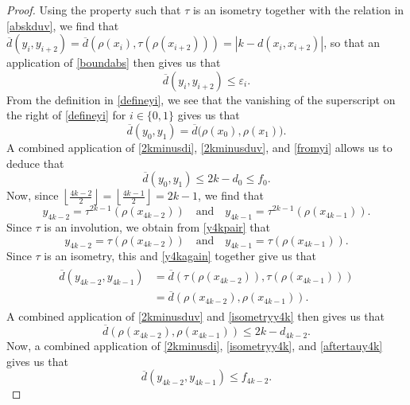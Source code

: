 \documentclass[10pt,a4paper]{amsart}
\begin{document}
\begin{proof}
 Using the property such that $\tau$ is an isometry together with the relation in \eqref{abskduv}, we find that $\overline{d}(y_i, y_{i + 
 2}) = \overline{d}(\rho(x_i), \tau(\rho(x_{i+2})))  = |k - d(x_{i}, x_{i+2}) |$, so that an application of \eqref{boundabs} 
 then gives us that 
\begin{equation}\label{metricgaptwo}
 \overline{d}(y_{i}, y_{i+2}) \leq \varepsilon_{i}. 
\end{equation}
 From the definition in \eqref{defineyi}, we see that the vanishing of the superscript on the right of \eqref{defineyi} for $i \in \{ 0, 
 1 \}$ gives us that 
\begin{equation}\label{fromyi} 
 \overline{d}(y_0, y_1) = \overline{d}\big( \rho(x_0), \rho(x_1) \big). 
\end{equation}
 A combined application of \eqref{2kminusdi}, \eqref{2kminusduv}, and 
 \eqref{fromyi} allows us to deduce that 
\begin{equation}\label{firstendpoint}
 \overline{d}(y_0, y_1) \leq 2 k - d_0 \leq f_0. 
\end{equation}
Now, since
 $\left\lfloor \frac{4k-2}{2} \right\rfloor = \left\lfloor \frac{4k-1}{2} \right\rfloor = 2 k - 1$, 
 we find that 
\begin{equation}\label{y4kpair}
 y_{4k-2} = \tau^{2k-1}\left( \rho(x_{4k-2}) \right) \quad \text{and} \quad
 y_{4k-1} = \tau^{2k-1}\left( \rho(x_{4k-1}) \right). 
\end{equation}
 Since $\tau$ is an involution, we obtain from \eqref{y4kpair} that 
\begin{equation}\label{y4kagain}
 y_{4k-2} = \tau\left( \rho(x_{4k-2}) \right) \quad \text{and} \quad
 y_{4k-1} = \tau\left( \rho(x_{4k-1}) \right). 
\end{equation}
 Since $\tau$ is an isometry, this and \eqref{y4kagain} together give us that 
\begin{align}
\begin{split}
 \overline{d}(y_{4k-2}, y_{4k-1})
 & = \overline{d}(\tau(\rho(x_{4k-2})), \tau(\rho(x_{4k-1}))) \\
 & = \overline{d}(\rho(x_{4k-2}), \rho(x_{4k-1})). 
\end{split}\label{isometryy4k}
\end{align}
 A combined application of \eqref{2kminusduv} and \eqref{isometryy4k} then gives us that 
\begin{equation}\label{aftertauy4k}
 \overline{d}(\rho(x_{4k-2}), \rho(x_{4k-1})) \leq 2 k - d_{4k-2}. 
\end{equation}
 Now, a combined application of \eqref{2kminusdi}, \eqref{isometryy4k}, and \eqref{aftertauy4k} gives us that 
\begin{equation}\label{secondendpoint} 
 \overline{d}(y_{4k-2}, y_{4k-1}) \leq f_{4k-2}. 
\end{equation}


\end{proof}
\end{document}
